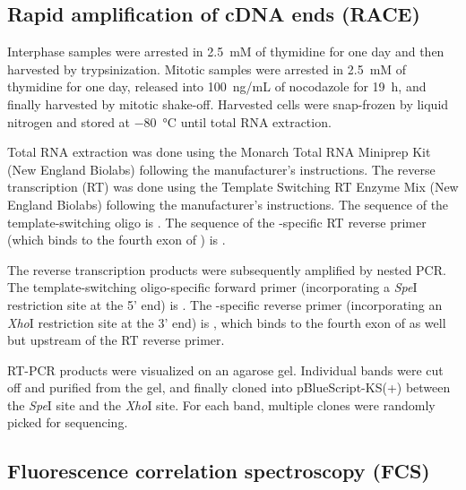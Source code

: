 \subsection{Rapid amplification of cDNA ends (RACE)}
Interphase samples were arrested in \SI{2.5}{mM} of thymidine for one day and then harvested by trypsinization. Mitotic samples were arrested in \SI{2.5}{mM} of thymidine for one day, released into \SI{100}{ng/mL} of nocodazole for \SI{19}{h}, and finally harvested by mitotic shake-off. Harvested cells were snap-frozen by liquid nitrogen and stored at \SI{-80}{\celsius} until total RNA extraction.

Total RNA extraction was done using the Monarch Total RNA Miniprep Kit (New England Biolabs) following the manufacturer’s instructions. The reverse transcription (RT) was done using the Template Switching RT Enzyme Mix (New England Biolabs) following the manufacturer’s instructions. The sequence of the template-switching oligo is . The sequence of the -specific RT reverse primer (which binds to the fourth exon of ) is .

The reverse transcription products were subsequently amplified by nested PCR. The template-switching oligo-specific forward primer (incorporating a \textit{Spe}I restriction site at the 5' end) is . The -specific reverse primer (incorporating an \textit{Xho}I restriction site at the 3' end) is , which binds to the fourth exon of  as well but upstream of the RT reverse primer.

RT-PCR products were visualized on an agarose gel. Individual bands were cut off and purified from the gel, and finally cloned into pBlueScript-KS(+) between the \textit{Spe}I site and the \textit{Xho}I site. For each band, multiple clones were randomly picked for sequencing.

\subsection{Fluorescence correlation spectroscopy (FCS)}
\label{FCSMethods}

